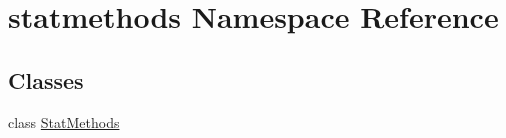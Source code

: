 \hypertarget{namespacestatmethods}{}\section{statmethods Namespace Reference}
\label{namespacestatmethods}
\subsection*{Classes}
\begin{DoxyCompactItemize}
\item 
class \hyperlink{classstatmethods_1_1StatMethods}{Stat\+Methods}
\end{DoxyCompactItemize}
